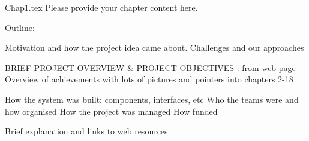 Chap1.tex
Please provide your chapter content here. 

Outline: 

Motivation and how the project idea came about.
Challenges and our approaches

BRIEF PROJECT OVERVIEW & PROJECT OBJECTIVES : from web page
      Overview of achievements with lots of pictures and pointers into
      chapters 2-18
      
How the system was built: components, interfaces, etc
Who the teams were and how organised
How the project was managed
How funded

Brief explanation and links to web resources 


